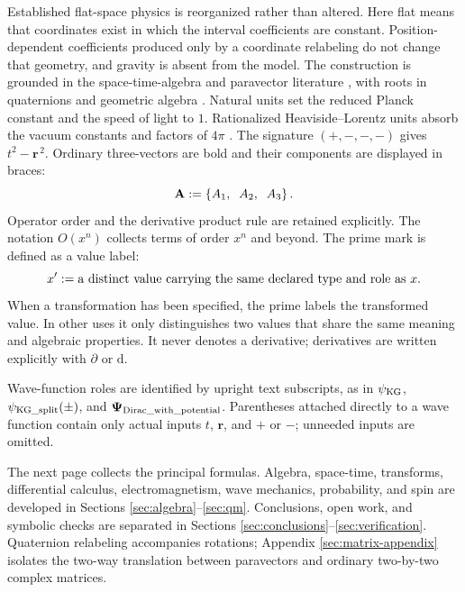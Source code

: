 \documentclass[10pt,letterpaper]{article}
\let\STAamsmathtext\text
\newcommand{\eqtext}[1]{\STAamsmathtext{\normalfont\rmfamily #1}}
\renewcommand{\text}[1]{\STAamsmathtext{\normalfont\rmfamily #1}}
\newcommand{\pv}[1]{#1}
\newcommand{\vct}[1]{\mathbf{#1}}
\newcommand{\bPsi}{\pv{\bm{\Psi}}}
\newcommand{\vthree}[3]{%
  \left\{#1,\mkern10mu #2,\mkern10mu #3\right\}%
}
\newcommand{\dd}{\mathrm d}
\begin{document}
Established flat-space physics is reorganized rather than altered. Here
flat means that coordinates exist in which the interval coefficients are
constant. Position-dependent coefficients produced only by a coordinate
relabeling do not change that geometry, and gravity is absent from the
model. The construction is grounded in the space-time-algebra and
paravector literature \cite{hestenes1966,baylis1999,doran2003}, with roots in
quaternions and geometric algebra \cite{hamilton1844,clifford1878}. Natural
units set the reduced Planck constant and the speed of light to \(1\).
Rationalized Heaviside--Lorentz units absorb the vacuum constants and factors
of \(4\pi\) \cite{jackson1998}. The signature \((+,-,-,-)\) gives
\(t^2-\vct{r}^{\,2}\). Ordinary three-vectors are bold and their components
are displayed in braces:
\begin{equation}
\vct{A}:=\vthree{A_1}{A_2}{A_3}.
\label{eq:three-vector-convention}
\end{equation}
Operator order and the derivative product rule are retained explicitly. The
notation \(O(x^n)\) collects terms of order \(x^n\) and beyond.
The prime mark is defined as a value label:
\begin{equation}
x' := \eqtext{a distinct value carrying the same declared type and role as }x.
\label{eq:prime-convention}
\end{equation}
When a transformation has been specified, the prime labels the transformed
value. In other uses it only distinguishes two values that share the same
meaning and algebraic properties. It never denotes a derivative; derivatives
are written explicitly with \(\partial\) or \(\dd\).

Wave-function roles are identified by upright text subscripts, as in
\(\psi_{\eqtext{KG}}\), \(\psi_{\eqtext{KG\_split}}(\pm)\), and
\(\bPsi_{\eqtext{Dirac\_with\_potential}}\). Parentheses attached directly
to a wave function contain only actual inputs \(t\), \(\vct{r}\), and
\(+\) or \(-\); unneeded inputs are omitted.

The next page collects the principal formulas. Algebra, space-time,
transforms, differential calculus, electromagnetism, wave mechanics,
probability, and spin are developed in Sections
\ref{sec:algebra}--\ref{sec:qm}. Conclusions, open work, and symbolic checks
are separated in Sections \ref{sec:conclusions}--\ref{sec:verification}.
Quaternion relabeling accompanies rotations; Appendix
\ref{sec:matrix-appendix} isolates the two-way translation between
paravectors and ordinary two-by-two complex matrices.
\endgroup
\end{document}
